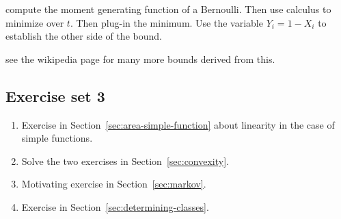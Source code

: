 \documentclass{article}
\begin{document}
 compute the moment generating function of a Bernoulli. Then use calculus to minimize over $t$. Then plug-in the minimum. Use the variable $Y_i = 1 - X_i$ to establish the other side of the bound.

 see the wikipedia page for many more bounds derived from this.  


\subsection{Exercise set 3}

\begin{enumerate}
	\item Exercise in Section~\ref{sec:area-simple-function} about  linearity in the case of simple functions.
	\item Solve the two exercises in Section~\ref{sec:convexity}.
	\item Motivating exercise in Section~\ref{sec:markov}.
	\item Exercise in Section~\ref{sec:determining-classes}.
\end{enumerate}
\end{document}
